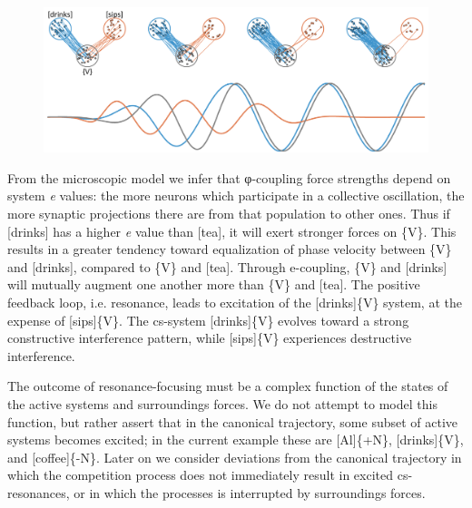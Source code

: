   
\begin{figure}
\includegraphics[width=\textwidth]{figures/Tilsen-img52.png}
\caption{\missingcaption}
\label{fig:4:2}
\end{figure}
 

  From the microscopic model we infer that φ{}-coupling force strengths depend on system \textit{e} values: the more neurons which participate in a collective oscillation, the more synaptic projections there are from that population to other ones. Thus if [drinks] has a higher \textit{e} value than [tea], it will exert stronger forces on \{V\}. This results in a greater tendency toward equalization of phase velocity between \{V\} and [drinks], compared to \{V\} and [tea]. Through e-coupling, \{V\} and [drinks] will mutually augment one another more than \{V\} and [tea]. The positive feedback loop, i.e. resonance, leads to excitation of the [drinks]\{V\} system, at the expense of [sips]\{V\}. The cs-system [drinks]\{V\} evolves toward a strong constructive interference pattern, while [sips]\{V\} experiences destructive interference.

  The outcome of resonance-focusing must be a complex function of the states of the active systems and surroundings forces. We do not attempt to model this function, but rather assert that in the canonical trajectory, some subset of active systems becomes excited; in the current example these are [Al]\{+N\}, [drinks]\{V\}, and [coffee]\{-N\}. Later on we consider deviations from the canonical trajectory in which the competition process does not immediately result in excited cs-resonances, or in which the processes is interrupted by surroundings forces.


